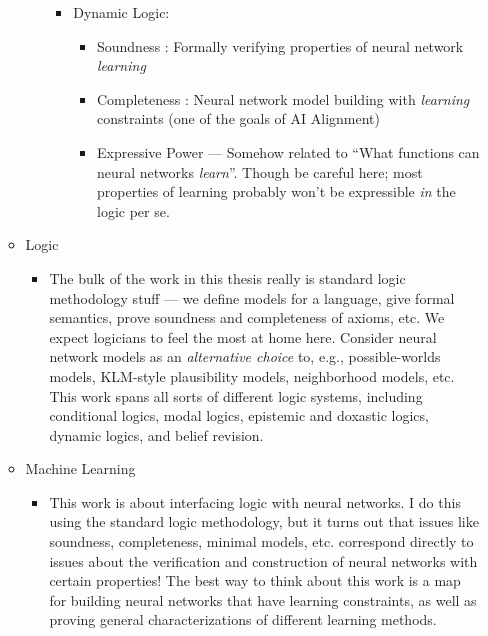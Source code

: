 \documentclass[letterpaper]{article}
\begin{document}
\begin{enumerate}
\begin{itemize}
\begin{itemize}
\begin{itemize}
                \item Dynamic Logic:
                \begin{itemize}
                    \item Soundness : Formally verifying properties of neural network \emph{learning}
                    \item Completeness : Neural network model building with \emph{learning} constraints (one of the goals of AI Alignment)
                    \item Expressive Power --- Somehow related to ``What functions can neural networks \emph{learn}''.  Though be careful here; most properties of learning probably won't be expressible \emph{in} the logic per se.\
                \end{itemize}
            \end{itemize}
        \end{itemize}
        
        \item Logic
        \begin{itemize}
            \item The bulk of the work in this thesis really is standard logic methodology stuff --- we define models for a language, give formal semantics, prove soundness and completeness of axioms, etc.  We expect logicians to feel the most at home here.  Consider neural network models as an \emph{alternative choice} to, e.g., possible-worlds models, KLM-style plausibility models, neighborhood models, etc.  This work spans all sorts of different logic systems, including conditional logics, modal logics, epistemic and doxastic logics, dynamic logics, and belief revision.
        \end{itemize}

        \item Machine Learning
        \begin{itemize}
            \item This work is about interfacing logic with neural networks.  I do this using the standard logic methodology, but it turns out that issues like soundness, completeness, minimal models, etc. correspond directly to issues about the verification and construction of neural networks with certain properties!  The best way to think about this work is a map for building neural networks that have learning constraints, as well as proving general characterizations of different learning methods.
        \end{itemize}


\end{itemize}
\end{enumerate}
\end{document}
